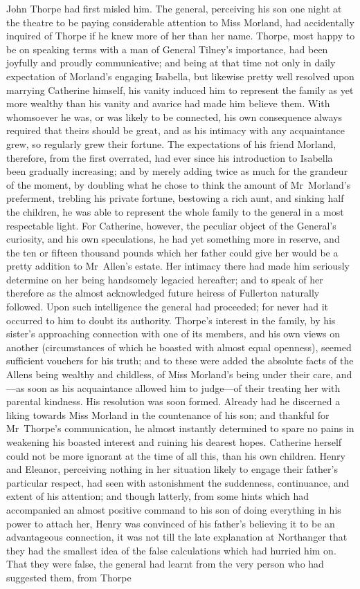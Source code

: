  John Thorpe had first misled him. The general, perceiving his son one night at the theatre to be paying considerable attention to Miss Morland, had accidentally inquired of Thorpe if he knew more of her than her name. Thorpe, most happy to be on speaking terms with a man of General Tilney's importance, had been joyfully and proudly communicative; and being at that time not only in daily expectation of Morland's engaging Isabella, but likewise pretty well resolved upon marrying Catherine himself, his vanity induced him to represent the family as yet more wealthy than his vanity and avarice had made him believe them. With whomsoever he was, or was likely to be connected, his own consequence always required that theirs should be great, and as his intimacy with any acquaintance grew, so regularly grew their fortune. The expectations of his friend Morland, therefore, from the first overrated, had ever since his introduction to Isabella been gradually increasing; and by merely adding twice as much for the grandeur of the moment, by doubling what he chose to think the amount of Mr~Morland's preferment, trebling his private fortune, bestowing a rich aunt, and sinking half the children, he was able to represent the whole family to the general in a most respectable light. For Catherine, however, the peculiar object of the General's curiosity, and his own speculations, he had yet something more in reserve, and the ten or fifteen thousand pounds which her father could give her would be a pretty addition to Mr~Allen's estate. Her intimacy there had made him seriously determine on her being handsomely legacied hereafter; and to speak of her therefore as the almost acknowledged future heiress of Fullerton naturally followed. Upon such intelligence the general had proceeded; for never had it occurred to him to doubt its authority. Thorpe's interest in the family, by his sister's approaching connection with one of its members, and his own views on another (circumstances of which he boasted with almost equal openness), seemed sufficient vouchers for his truth; and to these were added the absolute facts of the Allens being wealthy and childless, of Miss Morland's being under their care, and—as soon as his acquaintance allowed him to judge—of their treating her with parental kindness. His resolution was soon formed. Already had he discerned a liking towards Miss Morland in the countenance of his son; and thankful for Mr~Thorpe's communication, he almost instantly determined to spare no pains in weakening his boasted interest and ruining his dearest hopes. Catherine herself could not be more ignorant at the time of all this, than his own children. Henry and Eleanor, perceiving nothing in her situation likely to engage their father's particular respect, had seen with astonishment the suddenness, continuance, and extent of his attention; and though latterly, from some hints which had accompanied an almost positive command to his son of doing everything in his power to attach her, Henry was convinced of his father's believing it to be an advantageous connection, it was not till the late explanation at Northanger that they had the smallest idea of the false calculations which had hurried him on. That they were false, the general had learnt from the very person who had suggested them, from Thorpe 